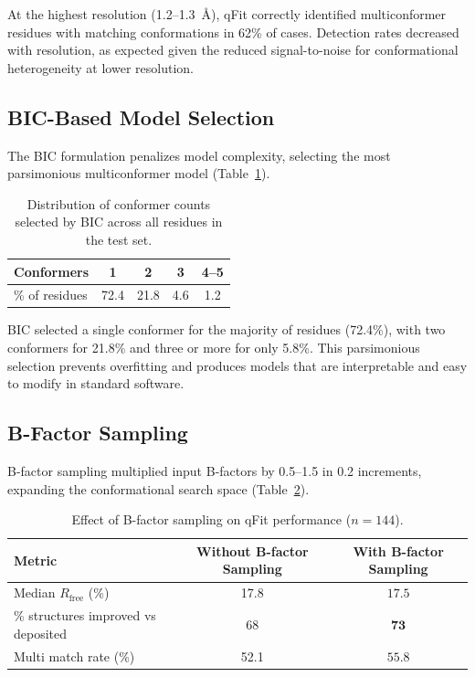 \documentclass[11pt]{article}
\begin{document}
At the highest resolution (1.2--1.3~\AA), qFit correctly identified multiconformer residues with matching conformations in 62\% of cases. Detection rates decreased with resolution, as expected given the reduced signal-to-noise for conformational heterogeneity at lower resolution.

\subsection{BIC-Based Model Selection}

The BIC formulation penalizes model complexity, selecting the most parsimonious multiconformer model (Table~\ref{tab:bic}).

\begin{table}[H]
\centering
\caption{Distribution of conformer counts selected by BIC across all residues in the test set.}
\label{tab:bic}
\begin{tabular}{lcccc}
\toprule
Conformers & 1 & 2 & 3 & 4--5 \\
\midrule
\% of residues & 72.4 & 21.8 & 4.6 & 1.2 \\
\bottomrule
\end{tabular}
\end{table}

BIC selected a single conformer for the majority of residues (72.4\%), with two conformers for 21.8\% and three or more for only 5.8\%. This parsimonious selection prevents overfitting and produces models that are interpretable and easy to modify in standard software.

\subsection{B-Factor Sampling}

B-factor sampling multiplied input B-factors by 0.5--1.5 in 0.2 increments, expanding the conformational search space (Table~\ref{tab:bfactor}).

\begin{table}[H]
\centering
\caption{Effect of B-factor sampling on qFit performance ($n = 144$).}
\label{tab:bfactor}
\begin{tabular}{lcc}
\toprule
Metric & Without B-factor Sampling & With B-factor Sampling \\
\midrule
Median $R_{\text{free}}$ (\%) & 17.8 & $\mathbf{17.5}$ \\
\% structures improved vs deposited & 68 & $\mathbf{73}$ \\
Multi match rate (\%) & 52.1 & $\mathbf{55.8}$ \\
\bottomrule
\end{tabular}
\end{table}
\end{document}
